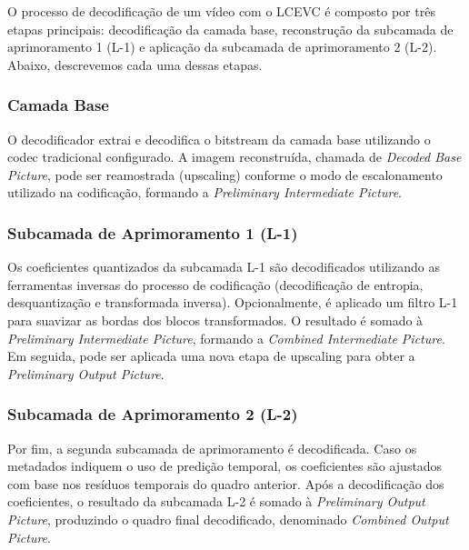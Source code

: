 %

O processo de decodificação de um vídeo com o \acrshort{LCEVC} é composto por três etapas principais: 
decodificação da camada base, reconstrução da subcamada de aprimoramento 1 (L-1) e aplicação da subcamada 
de aprimoramento 2 (L-2). Abaixo, descrevemos cada uma dessas etapas.

\subsubsection{Camada Base}

O decodificador extrai e decodifica o bitstream da camada base utilizando o codec tradicional configurado. 
A imagem reconstruída, chamada de \textit{Decoded Base Picture}, pode ser reamostrada (upscaling) conforme 
o modo de escalonamento utilizado na codificação, formando a \textit{Preliminary Intermediate Picture}.
\cite{MPEG2022LCEVC, overview_lcevc}

\subsubsection{Subcamada de Aprimoramento 1 (L-1)}

Os coeficientes quantizados da subcamada \cite{overview_lcevc}L-1 são decodificados utilizando as ferramentas inversas do processo 
de codificação (decodificação de entropia, desquantização e transformada inversa). Opcionalmente, é aplicado 
um filtro L-1 para suavizar as bordas dos blocos transformados. O resultado é somado à \textit{Preliminary 
Intermediate Picture}, formando a \textit{Combined Intermediate Picture}. Em seguida, pode ser aplicada uma 
nova etapa de upscaling para obter a \textit{Preliminary Output Picture}. \cite{MPEG2022LCEVC, overview_lcevc}

\subsubsection{Subcamada de Aprimoramento 2 (L-2)}

Por fim, a segunda subcamada de aprimoramento é decodificada. Caso os metadados indiquem o uso de predição
temporal, os coeficientes são ajustados com base nos resíduos temporais do quadro anterior. Após a decodificação 
dos coeficientes, o resultado da subcamada L-2 é somado à \textit{Preliminary Output Picture}, produzindo o quadro 
final decodificado, denominado \textit{Combined Output Picture}. \cite{MPEG2022LCEVC, overview_lcevc}